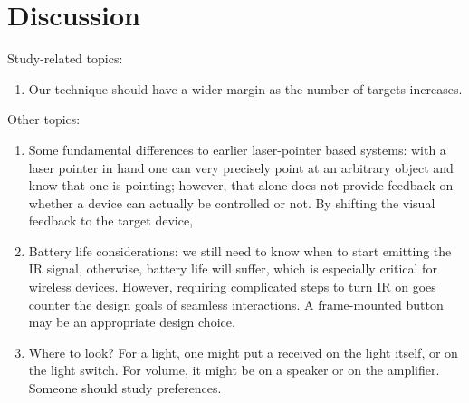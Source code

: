 \section{Discussion}

Study-related topics:
\begin{enumerate}
\item Our technique should have a wider margin as the number of targets increases.

\end{enumerate}

Other topics:
\begin{enumerate}
\item Some fundamental differences to earlier laser-pointer based systems: with a laser pointer in hand one can very precisely point at an arbitrary object and know that one is pointing; however, that alone does not provide feedback on whether a device can actually be controlled or not. By shifting the visual feedback to the target device, 

\item Battery life considerations: we still need to know when to start emitting the IR signal, otherwise, battery life will suffer, which is especially critical for wireless devices. However, requiring complicated steps to turn IR on goes counter the design goals of seamless interactions. A frame-mounted button may be an appropriate design choice.

\item Where to look? For a light, one might put a received on the light itself, or on the light switch. For volume, it might be on a speaker or on the amplifier. Someone should study preferences.
\end{enumerate}

